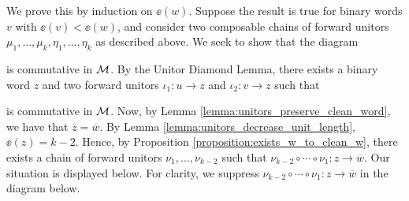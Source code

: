 \begin{prf}
    We prove this by induction on $\ee(w)$. Suppose the result is true for 
    binary words $v$ with $\ee(v) < \ee(w)$, and consider two composable 
    chains of forward unitors $\mu_1, \dots, \mu_k, \eta_1, \dots, \eta_k$ 
    as described above. We seek to show that the diagram 
    \begin{center}
    \end{center}
    is commutative in $\mm$. By the Unitor Diamond Lemma, there exists a binary 
    word $z$ and two forward unitors $\iota_1: u \to z$ and $\iota_2: v \to z$ 
    such that 
    \begin{center}
    \end{center}
    is commutative in $\mm$. Now, by Lemma \ref{lemma:unitors_preserve_clean_word}, 
    we have that 
    $\overline{z} = \overline{w}$. By Lemma \ref{lemma:unitors_decrease_unit_length}, 
    $\ee(z) = k - 2$.
    Hence, by Proposition \ref{proposition:exists_w_to_clean_w}, 
    there exists a chain of forward unitors $\nu_1, \dots, \nu_{k-2}$ 
    such that $\nu_{k-2} \circ \cdots \circ \nu_1: z \to \overline{w}$.
    Our situation is displayed below. For clarity, we suppress $\nu_{k-2} \circ \cdots \circ \nu_1: z \to \overline{w}$ 
    in the diagram below.
    \begin{center}
        \begin{tikzcd}[column sep = 1.4cm, row sep = 1.4cm]

\end{tikzcd}
\end{center}
\end{prf}
